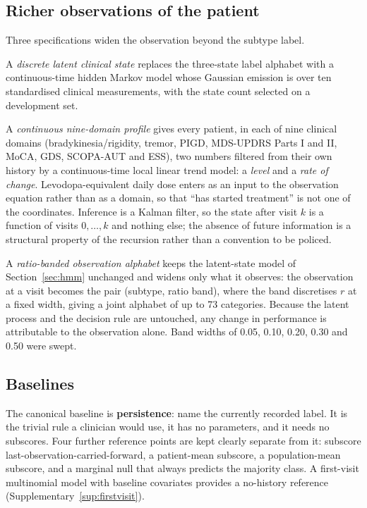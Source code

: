 \documentclass[11pt]{article}
\begin{document}
\subsection{Richer observations of the patient}
\label{sec:methods-richer}
Three specifications widen the observation beyond the subtype label.

A \emph{discrete latent clinical state} replaces the three-state label alphabet
with a continuous-time hidden Markov model whose Gaussian emission is over ten
standardised clinical measurements, with the state count selected on a
development set.

A \emph{continuous nine-domain profile} gives every patient, in each of nine
clinical domains (bradykinesia/rigidity, tremor, PIGD, MDS-UPDRS Parts I and II,
MoCA, GDS, SCOPA-AUT and ESS), two numbers filtered from their own history by a
continuous-time local linear trend model: a \emph{level} and a \emph{rate of
change}. Levodopa-equivalent daily dose enters as an input to the observation
equation rather than as a domain, so that ``has started treatment'' is not one of
the coordinates. Inference is a Kalman filter, so the state after visit $k$ is a
function of visits $0,\dots,k$ and nothing else; the absence of future
information is a structural property of the recursion rather than a convention to
be policed.

A \emph{ratio-banded observation alphabet} keeps the latent-state model of
Section~\ref{sec:hmm} unchanged and widens only what it observes: the observation
at a visit becomes the pair (subtype, ratio band), where the band discretises $r$
at a fixed width, giving a joint alphabet of up to 73 categories. Because the
latent process and the decision rule are untouched, any change in performance is
attributable to the observation alone. Band widths of 0.05, 0.10, 0.20, 0.30 and
0.50 were swept.

\subsection{Baselines}
The canonical baseline is \textbf{persistence}: name the currently recorded
label. It is the trivial rule a clinician would use, it has no parameters, and it
needs no subscores. Four further reference points are kept clearly separate from
it: subscore last-observation-carried-forward, a patient-mean subscore, a
population-mean subscore, and a marginal null that always predicts the majority
class. A first-visit multinomial model with baseline covariates provides a
no-history reference (Supplementary~\ref{sup:firstvisit}).
\end{document}

